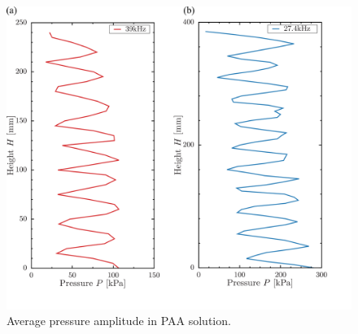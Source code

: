 \begin{figure}[ht]
	\centering
	\includegraphics[width=12cm,clip]{4-Results/press.png}
	\caption{Average pressure amplitude in PAA solution.}
	\label{fig:pressure}
\end{figure}
